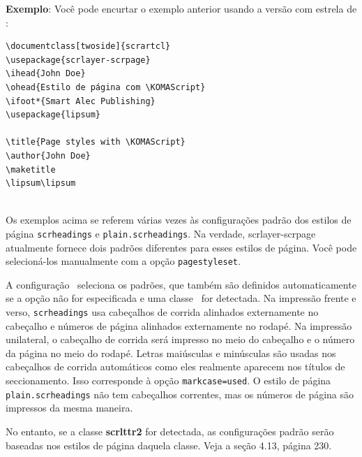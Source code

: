 \textbf{Exemplo}: Você pode encurtar o exemplo anterior usando a versão com estrela de :
\begin{verbatim}
\documentclass[twoside]{scrartcl}
\usepackage{scrlayer-scrpage}
\ihead{John Doe}
\ohead{Estilo de página com \KOMAScript}
\ifoot*{Smart Alec Publishing}
\usepackage{lipsum}

\title{Page styles with \KOMAScript}
\author{John Doe}
\maketitle
\lipsum\lipsum
 
\end{verbatim}

Os exemplos acima se referem várias vezes às configurações padrão dos estilos de página \texttt{scrheadings} e \texttt{plain.scrheadings}. Na verdade, scrlayer-scrpage atualmente fornece dois padrões diferentes para esses estilos de página. Você pode selecioná-los manualmente com a opção \texttt{pagestyleset}.

A configuração \KOMAScript\ seleciona os padrões, que também são definidos automaticamente se a opção não for especificada e uma classe \KOMAScript\ for detectada. Na impressão frente e verso, \texttt{scrheadings} usa cabeçalhos de corrida alinhados externamente no cabeçalho e números de página alinhados externamente no rodapé. Na impressão unilateral, o cabeçalho de corrida será impresso no meio do cabeçalho e o número da página no meio do rodapé. Letras maiúsculas e minúsculas são usadas nos cabeçalhos de corrida automáticos como eles realmente aparecem nos títulos de seccionamento. Isso corresponde à opção \texttt{markcase=used}. O estilo de página \texttt{plain.scrheadings} não tem cabeçalhos correntes, mas os números de página são impressos da mesma maneira.

No entanto, se a classe \textbf{scrlttr2} for detectada, as configurações padrão serão baseadas nos estilos de página daquela classe. Veja a seção 4.13, página 230.


